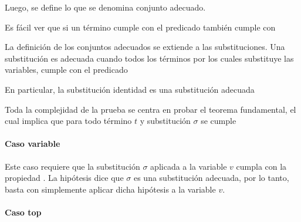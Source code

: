 \documentclass[]{report}
\begin{document}
	
	Luego, se define lo que se denomina conjunto adecuado.
	
	
	Es fácil ver que si un término cumple con el predicado  también cumple con 
	
	
	La definición de los conjuntos adecuados se extiende a las substituciones.
	Una substitución es adecuada cuando todos los términos por los cuales substituye las variables, cumple con el predicado 
	
	
	En particular, la substitución identidad  es una substitución adecuada
	
	Toda la complejidad de la prueba se centra en probar el teorema fundamental, el cual implica que para todo término $t$ y substitución $\sigma$ se cumple \AgdaSpace{}%
	\AgdaSpace{}%
	\AgdaSymbol{(}\AgdaSpace{}%
	\AgdaSpace{}%
	\AgdaSpace{}%
	\AgdaSymbol{)}
	
	
	\newcommand{\snstar}{\AgdaDatatype{SN*}\AgdaSpace{}\AgdaOperator{\AgdaFunction{⟦\AgdaUnderscore{}⟧}\AgdaSpace{}}}
	\newcommand{\cand}[1]{\AgdaOperator{\AgdaFunction{⟦}}\AgdaSpace{}#1\AgdaSpace{}\AgdaOperator{\AgdaFunction{⟧}}}

	\paragraph{Caso variable}
	
	Este caso requiere que la substitución $\sigma$ aplicada a la variable $v$ cumpla con la propiedad
	\snstar.
	La hipótesis dice que $\sigma$ es una substitución adecuada, por lo tanto, basta con simplemente aplicar dicha hipótesis a la variable $v$.
	

	\paragraph{Caso top}
	
\end{document}
